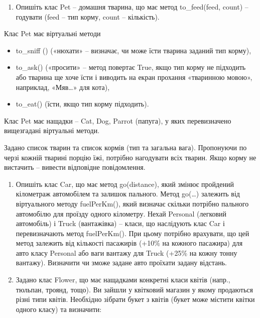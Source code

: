 \documentclass[]{article}
\makeatletter
\newcommand{\xslalph}[1]{\expandafter\@xslalph\csname c@#1\endcsname}
\newcommand{\@xslalph}[1]{%
    \ifcase#1\or а\or б\or в\or г\or д\or e\or є\or ж\or з\or i%
    \or й\or к\or л\or м\or н\or о\or п\or р\or с\or т%
    \or у\or ф\or х\or ц\or ч\or ш\or ю\or я\or аа\or бб\or вв%
    \else\@ctrerr\fi%
}
\makeatother
\begin{document}
\begin{enumerate}
\begin{enumerate}[label=\xslalph*)]
\begin{enumerate}
\begin{enumerate}[label=\xslalph*)]
\begin{enumerate}
\def\labelenumi{\arabic{enumi})}
\item
  Опишіть клас Pet -- домашня тварина, що має метод to\_feed(feed,
  count) -- годувати (feed -- тип корму, count -- кількість).
\end{enumerate}

Клас Pet має віртуальні методи

\begin{itemize}
\item
  to\_sniff () («нюхати» -- визначає, чи може їсти тварина заданий тип
  корму),
\item
  to\_ask() («просити» -- метод повертає True, якщо тип корму не
  підходить або тварина ще хоче їсти і виводить на екран прохання
  «тваринною мовою», наприклад, «Мяв\ldots{}» для кота),
\item
  to\_eat() (їсти, якщо тип корму підходить).
\end{itemize}

Клас Pet має нащадки -- Cat, Dog, Parrot (папуга), у яких перевизначено
вищезгадані віртуальні методи.

Задано список тварин та список кормів (тип та загальна вага). Пропонуючи
по черзі кожній тварині порцію їжі, потрібно нагодувати всіх тварин.
Якщо корму не вистачить -- вивести відповідне повідомлення.

\begin{enumerate}
\def\labelenumi{\arabic{enumi})}
\item
  Опишіть клас Car, що має метод go(distance), який змінює пройдений
  кілометраж автомобілем та залишок пального. Метод go(\ldots{})
  залежить від віртуального методу fuelPerKm(), який визначає скільки
  потрібно пального автомобілю для проїзду одного кілометру. Нехай
  Personal (легковий автомобіль) і Truck (вантажівка) -- класи, що
  наслідують клас Car і перевизначають метод fuelPerKm(). При цьому
  потрібно врахувати, що цей метод залежить від кількості пасажирів
  (+10\% на кожного пасажира) для авто класу Personal або ваги вантажу
  для Truck (+25\% на кожну тонну вантажу). Визначити чи зможе задане
  авто проїхати задану відстань.
\item
  Задано клас Flower, що має нащадками конкретні класи квітів (напр.,
  тюльпан, троянд, тощо). Ви зайшли у квітковий магазин у якому
  продаються різні типи квітів. Необхідно зібрати букет з квітів (букет
  може містити квітки одного класу) та визначити:
\end{enumerate}


\end{enumerate}
\end{enumerate}
\end{enumerate}
\end{enumerate}
\end{document}
